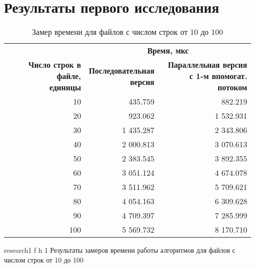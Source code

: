 \clearpage

\section*{Результаты первого исследования}

\begin{table}[ht]
	\small
	\begin{center}
		\begin{threeparttable}
			\caption{Замер времени для файлов с числом строк от 10 до 100}
			\label{tbl:time}
			\begin{tabular}{|r|r|r|}
				\hline
				& \multicolumn{2}{c|}{\bfseries Время, мкс} \\ \cline{2-3}
				\bfseries \makecell{Число строк в файле, \\ единицы} & \bfseries \makecell{Последовательная \\ версия} & \bfseries \makecell{Параллельная версия \\ с 1-м впомогат. потоком} \\ \cline{2-3}
				\hline
				10 & 435.759 & 882.219  \\
				\hline
				20 & 923.062 & 1 532.931 \\
				\hline
				30 & 1 435.287 & 2 343.806  \\
				\hline
				40 & 2 000.813 & 3 070.613 \\
				\hline
				50 & 2 383.545 & 3 892.355  \\
				\hline
				60 & 3 051.124 & 4 674.078  \\
				\hline
				70 & 3 511.962 & 5 709.621  \\
				\hline
				80 & 4 054.163 & 6 309.628  \\
				\hline
				90 & 4 709.397 & 7 285.999  \\
				\hline
				100 & 5 569.732 & 8 170.710  \\
				\hline
			\end{tabular}	
		\end{threeparttable}
	\end{center}
\end{table}

\clearpage

{research1} %
{f} %
{h} %
{1\textwidth} %
{Результаты замеров времени работы алгоритмов для файлов с числом строк от 10 до 100} %

